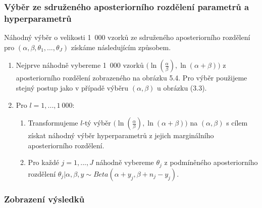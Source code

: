 \subsubsection{Výběr ze sdruženého aposteriorního rozdělení parametrů a hyperparametrů}

Náhodný výběr o velikosti 1~000 vzorků ze sdruženého aposteriorního rozdělení pro $(\alpha, \beta, \theta_1, ..., \theta_J)$ získáme následujícím způsobem.

\begin{enumerate}
\item Nejprve náhodně vybereme 1~000 vzorků $\big(\ln(\frac{\alpha}{\beta}), \ln(\alpha + \beta) \big)$ z aposteriorního rozdělení zobrazeného na obrázku 5.4. Pro výběr použijeme stejný postup jako v případě výběru $(\alpha, \beta)$ u obrázku (3.3).
\item Pro $l = 1, ..., 1~000$:
\begin{enumerate}
\item Transformujeme $l$-tý výběr $\big(\ln(\frac{\alpha}{\beta}), \ln(\alpha + \beta) \big)$ na $(\alpha, \beta)$ s cílem získat náhodný výběr hyperparametrů z jejich marginálního aposteriorního rozdělení.
\item Pro každé $j = 1, ..., J$ náhodně vybereme $\theta_j$ z podmíněného aposteriorního rozdělení $\theta_j | \alpha, \beta, y \sim \textit{Beta}(\alpha + y_j, \beta + n_j - y_j)$.
\end{enumerate}
\end{enumerate}

\subsubsection{Zobrazení výsledků}


